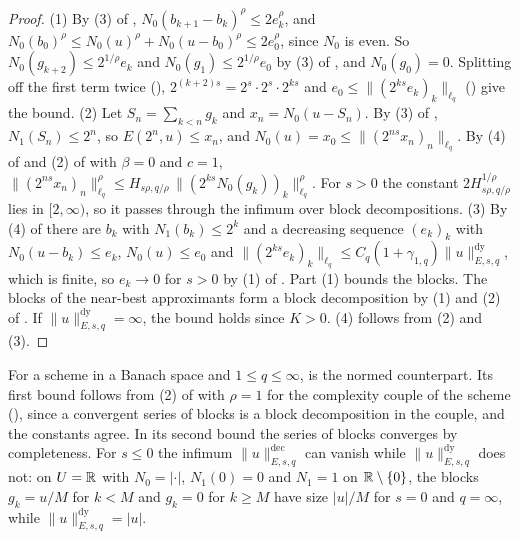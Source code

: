 \begin{proof}
\leanok
{}
(1) By (3) of , $N_0(b_{k+1} - b_k)^\rho \leq 2 e_k^\rho$, and
$N_0(b_0)^\rho \leq N_0(u)^\rho + N_0(u - b_0)^\rho \leq 2 e_0^\rho$, since $N_0$ is even. So
$N_0(g_{k+2}) \leq 2^{1/\rho} e_k$ and $N_0(g_1) \leq 2^{1/\rho} e_0$ by (3) of
, and $N_0(g_0) = 0$. Splitting off the first term twice
(), $2^{(k+2)s} = 2^s \cdot 2^s \cdot 2^{ks}$ and
$e_0 \leq \|(2^{ks} e_k)_k\|_{\ell_q}$ () give the bound. (2) Let
$S_n = \sum_{k<n} g_k$ and $x_n = N_0(u - S_n)$. By (3) of ,
$N_1(S_n) \leq 2^n$, so $E(2^n, u) \leq x_n$, and $N_0(u) = x_0 \leq \|(2^{ns} x_n)_n\|_{\ell_q}$.
By (4) of  and (2) of  with $\beta = 0$
and $c = 1$, $\|(2^{ns} x_n)_n\|_{\ell_q}^\rho \leq H_{s\rho, q/\rho} \,
\|(2^{ks} N_0(g_k))_k\|_{\ell_q}^\rho$. For $s > 0$ the constant $2 H_{s\rho, q/\rho}^{1/\rho}$
lies in $[2, \infty)$, so it passes through the infimum over block decompositions. (3) By (4) of
 there are $b_k$ with $N_1(b_k) \leq 2^k$ and a decreasing sequence
$(e_k)_k$ with $N_0(u - b_k) \leq e_k$, $N_0(u) \leq e_0$ and
$\|(2^{ks} e_k)_k\|_{\ell_q} \leq C_q (1 + \gamma_{1,q}) \|u\|^{\mathrm{dy}}_{E, s, q}$, which is
finite, so $e_k \to 0$ for $s > 0$ by (1) of . Part (1) bounds the
blocks. The blocks of the near-best approximants form a block decomposition by (1) and (2) of
.
If $\|u\|^{\mathrm{dy}}_{E, s, q} = \infty$, the bound holds since $K > 0$. (4) follows from (2)
and (3).
\end{proof}

For a scheme in a Banach space and $1 \leq q \leq \infty$,  is the
normed counterpart. Its first bound follows from (2) of  with
$\rho = 1$ for the complexity couple of the scheme (), since a
convergent series of blocks is a block decomposition in the couple, and the constants agree. In
its second bound the series of blocks converges by completeness. For $s \leq 0$ the infimum
$\|u\|^{\mathrm{dec}}_{E, s, q}$ can vanish while $\|u\|^{\mathrm{dy}}_{E, s, q}$ does not: on
$U = \mathbb{R}$ with $N_0 = |\cdot|$, $N_1(0) = 0$ and $N_1 = 1$ on $\mathbb{R} \setminus \{0\}$, the blocks
$g_k = u/M$ for $k < M$ and $g_k = 0$ for $k \geq M$ have size $|u|/M$ for $s = 0$ and
$q = \infty$, while $\|u\|^{\mathrm{dy}}_{E, s, q} = |u|$.

